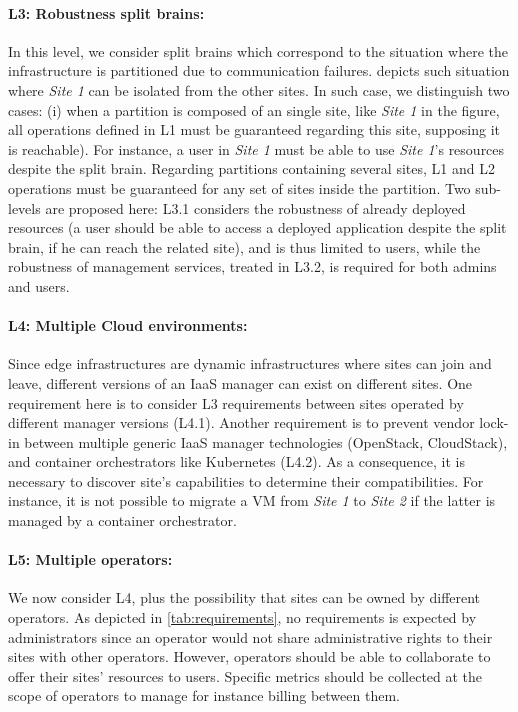 \paragraph{L3: Robustness \wrt split brains:}
In this level, we consider split brains which correspond to the situation
where the infrastructure is partitioned due to communication failures.
 depicts such situation where \emph{Site 1} can be
isolated from the other sites. In such case, we distinguish two cases: (i) when
a partition is composed of an single site, like \emph{Site 1} in the figure,
all operations defined in L1 must be guaranteed regarding this site, supposing
it is reachable). For instance, a user in \emph{Site 1} must be
able to use \emph{Site 1}'s resources despite the split brain. Regarding
partitions containing several sites, L1 and L2 operations must be guaranteed
for any set of sites inside the partition.
Two sub-levels are proposed here: L3.1 considers the robustness of already
deployed resources (\eg a user should be able to access a deployed application
despite the split brain, if he can reach the related site), and is thus limited
to users, while the robustness of management services, treated in L3.2, is
required for both admins and users.

\paragraph{L4: Multiple Cloud environments:}
Since edge infrastructures are dynamic infrastructures where sites can join and
leave, different versions of an IaaS manager can exist on different sites. One
requirement here is to consider L3 requirements between sites operated by
different manager versions (L4.1). Another requirement is to prevent vendor
lock-in between multiple generic IaaS manager technologies (\eg OpenStack,
CloudStack), and container orchestrators like Kubernetes (L4.2).
As a consequence, it is necessary to discover site's capabilities to determine
their compatibilities. For instance, it is not possible to migrate a VM from
\emph{Site 1} to \emph{Site 2} if the latter is managed by a container
orchestrator.

\paragraph{L5: Multiple operators:}
We now consider L4, plus the possibility that sites can be owned by different
operators. As depicted in \cref{tab:requirements}, no requirements is expected
by administrators since an operator would not share administrative rights to
their sites with other operators. However,
operators should be able to collaborate to offer their sites' resources to
users. Specific metrics should be collected at the scope of operators to
manage for instance billing between them.\\

